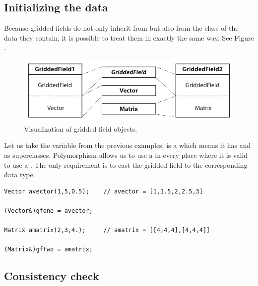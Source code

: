 \subsection{Initializing the data}

Because gridded fields do not only inherit from  but also from the class of the data they contain, it is possible to treat them in exactly the same way. See Figure .

\begin{figure}[ht!]
\begin{center}
\includegraphics{Figs/development/griddedfields_objects}
\caption{Visualization of gridded field objects.}
\end{center}
\end{figure}

Let us take the  variable from the previous examples.  is a  which means it has  and  as superclasses. Polymorphism allows us to use a  in every place where it is valid to use a . The only requirement is to cast the gridded field to the corresponding data type.

\begin{verbatim}
Vector avector(1,5,0.5);    // avector = [1,1.5,2,2.5,3]

(Vector&)gfone = avector;

Matrix amatrix(2,3,4.);     // amatrix = [[4,4,4],[4,4,4]]

(Matrix&)gftwo = amatrix;
\end{verbatim}

\subsection{Consistency check}

